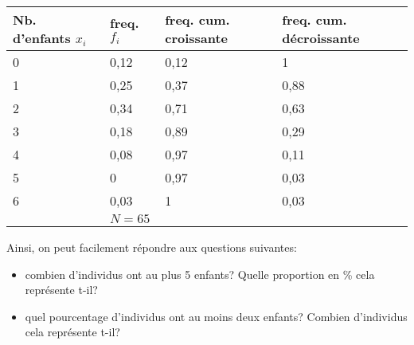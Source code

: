 \documentclass[a4paper,12pt]{scrartcl}
\begin{document}
\begin{center}
\begin{tabular}{l|l|ll}
\hline
\multicolumn{1}{|l|}{\textbf{Nb. d'enfants $x_i$}} & \textbf{freq. $f_i$} & \multicolumn{1}{l|}{\textbf{freq. cum. croissante}} & \multicolumn{1}{l|}{\textbf{freq. cum. décroissante}} \\ \hline
\multicolumn{1}{|l|}{0}                               & 0,12                     & \multicolumn{1}{l|}{0,12}                           & \multicolumn{1}{l|}{1}                                \\ \hline
\multicolumn{1}{|l|}{1}                               & 0,25                     & \multicolumn{1}{l|}{0,37}                           & \multicolumn{1}{l|}{0,88}                             \\ \hline
\multicolumn{1}{|l|}{2}                               & 0,34                     & \multicolumn{1}{l|}{0,71}                           & \multicolumn{1}{l|}{0,63}                             \\ \hline
\multicolumn{1}{|l|}{3}                               & 0,18                     & \multicolumn{1}{l|}{0,89}                           & \multicolumn{1}{l|}{0,29}                             \\ \hline
\multicolumn{1}{|l|}{4}                               & 0,08                     & \multicolumn{1}{l|}{0,97}                           & \multicolumn{1}{l|}{0,11}                             \\ \hline
\multicolumn{1}{|l|}{5}                               & 0                        & \multicolumn{1}{l|}{0,97}                           & \multicolumn{1}{l|}{0,03}                             \\ \hline
\multicolumn{1}{|l|}{6}                               & 0,03                     & \multicolumn{1}{l|}{1}                              & \multicolumn{1}{l|}{0,03}                             \\ \hline
                                                      & $N= 65$                    &                                                     &                                                       \\ \cline{2-2}
\end{tabular}
\end{center}

Ainsi, on peut facilement répondre aux questions suivantes:

\begin{itemize}
\item combien d'individus ont au plus 5 enfants? Quelle proportion en \% cela représente t-il? 


\item quel pourcentage d'individus ont au moins deux enfants? Combien d'individus cela représente t-il?

\end{itemize}
\end{document}
